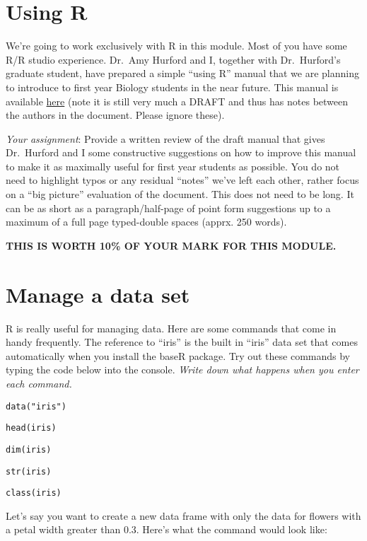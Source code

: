 \documentclass[]{book}
\begin{document}
\hypertarget{using-r}{%
\chapter{Using R}\label{using-r}}

We're going to work exclusively with R in this module. Most of you have some R/R studio experience. Dr.~Amy Hurford and I, together with Dr.~Hurford's graduate student, have prepared a simple ``using R'' manual that we are planning to introduce to first year Biology students in the near future. This manual is available \href{https://ahurford.github.io/quantitative-training-guide/}{here} (note it is still very much a DRAFT and thus has notes between the authors in the document. Please ignore these).

\emph{Your assignment}: Provide a written review of the draft manual that gives Dr.~Hurford and I some constructive suggestions on how to improve this manual to make it as maximally useful for first year students as possible. You do not need to highlight typos or any residual ``notes'' we've left each other, rather focus on a ``big picture'' evaluation of the document. This does not need to be long. It can be as short as a paragraph/half-page of point form suggestions up to a maximum of a full page typed-double spaces (apprx. 250 words).

\textbf{THIS IS WORTH 10\% OF YOUR MARK FOR THIS MODULE.}

\hypertarget{manage-a-data-set}{%
\chapter{Manage a data set}\label{manage-a-data-set}}

R is really useful for managing data. Here are some commands that come in handy frequently. The reference to ``iris'' is the built in ``iris'' data set that comes automatically when you install the baseR package. Try out these commands by typing the code below into the console. \emph{Write down what happens when you enter each command.}

\texttt{data("iris")}

\texttt{head(iris)}

\texttt{dim(iris)}

\texttt{str(iris)}

\texttt{class(iris)}

Let's say you want to create a new data frame with only the data for flowers with a petal width greater than 0.3. Here's what the command would look like:
\end{document}
